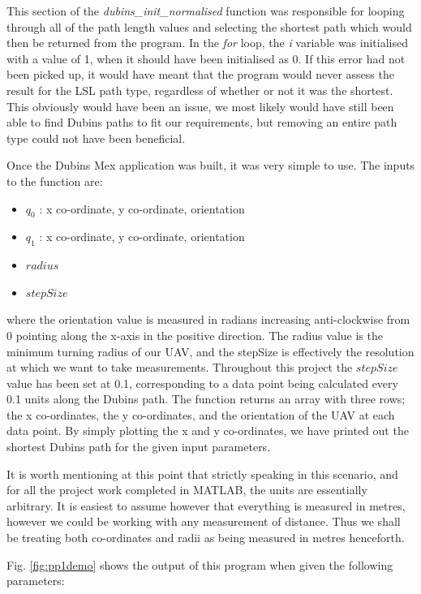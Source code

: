 This section of the \textit{dubins\_init\_normalised} function was responsible for looping through all of the path length values and selecting the shortest path which would then be returned from the program. In the \textit{for} loop, the \textit{i} variable was initialised with a value of 1, when it should have been initialised as 0. If this error had not been picked up, it would have meant that the program would never assess the result for the LSL path type, regardless of whether or not it was the shortest. This obviously would have been an issue, we most likely would have still been able to find Dubins paths to fit our requirements, but removing an entire path type could not have been beneficial. 

Once the Dubins Mex application was built, it was very simple to use. The inputs to the function are:
\begin{itemize}
	\item $q_0$ : x co-ordinate, y co-ordinate, orientation
	\item $q_1$ : x co-ordinate, y co-ordinate, orientation
	\item $radius$
	\item $stepSize$
\end{itemize}

where the orientation value is measured in radians increasing anti-clockwise from 0 pointing along the x-axis in the positive direction. The radius value is the minimum turning radius of our UAV, and the stepSize is effectively the resolution at which we want to take measurements. Throughout this project the $stepSize$ value has been set at 0.1, corresponding to a data point being calculated every 0.1 units along the Dubins path. The function returns an array with three rows; the x co-ordinates, the y co-ordinates, and the orientation of the UAV at each data point. By simply plotting the x and y co-ordinates, we have printed out the shortest Dubins path for the given input parameters. 

It is worth mentioning at this point that strictly speaking in this scenario, and for all the project work completed in MATLAB, the units are essentially arbitrary. It is easiest to assume however that everything is measured in metres, however we could be working with any measurement of distance. Thus we shall be treating both co-ordinates and radii as being measured in metres henceforth.

Fig. \ref{fig:pp1demo} shows the output of this program when given the following parameters:

